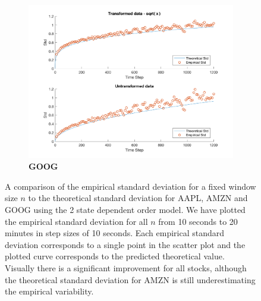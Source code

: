 \begin{figure}[htbp]
\begin{subfigure}[t]{0.49\textwidth}
\end{subfigure}

\begin{subfigure}[t]{0.49\textwidth}
\captionsetup{labelformat=empty}

\caption{\textbf{GOOG}}
\includegraphics[width=\textwidth]{2SDO_Fit/GOOG_Plot_GCHP2SDO_21600.png}

\end{subfigure}

\caption{\label{fig:2SDOfit} A comparison of the empirical standard deviation for a fixed window size $n$ to the theoretical standard deviation for AAPL, AMZN and GOOG using the 2 state dependent order model. We have plotted the empirical standard deviation for all $n$ from 10 seconds to 20 minutes in step sizes of 10 seconds. Each empirical standard deviation corresponds to a single point in the scatter plot and the plotted curve corresponds to the predicted theoretical value. Visually there is a significant improvement for all stocks, although the theoretical standard deviation for AMZN is still underestimating the empirical variability.}

\end{figure}